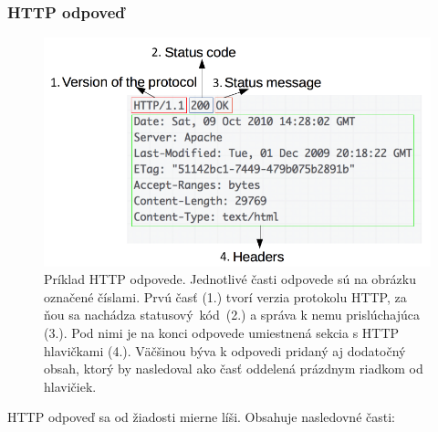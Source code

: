 \subsubsection{HTTP odpoveď}

\begin{figure}[htb]
\begin{center}
    \includegraphics[scale=0.6]{obrazky-figures/http_response.png}
    \caption{\centering Príklad HTTP odpovede. Jednotlivé časti odpovede sú na obrázku označené číslami. Prvú časť (1.) tvorí verzia protokolu HTTP, za ňou sa nachádza \mbox{statusový kód (2.)} a správa k nemu prislúchajúca (3.). Pod nimi je na konci odpovede umiestnená sekcia s HTTP hlavičkami (4.). Väčšinou býva k odpovedi pridaný aj dodatočný obsah, ktorý by nasledoval ako časť oddelená prázdnym riadkom od hlavičiek.}
    \label{fig:http-response}
\end{center}
\end{figure}

\noindent HTTP odpoveď sa od žiadosti mierne líši. Obsahuje nasledovné časti:

